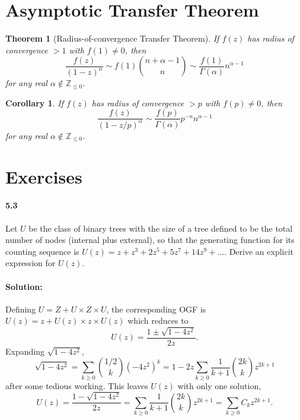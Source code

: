 \documentclass{article}
\newtheorem{corollary}{Corollary}
\newtheorem{theorem}{Theorem}
\begin{document}
\section{Asymptotic Transfer Theorem}

\begin{theorem}[Radius-of-convergence Transfer Theorem]
  If $f(z)$ has radius of convergence $> 1$ with $f(1) \neq 0$, then
  \begin{equation*}
    [z^n]\frac{f(z)}{(1 - z)^{\alpha}}
      \sim f(1)\binom{n + \alpha - 1}{n}
      \sim \frac{f(1)}{\Gamma(\alpha)}n^{\alpha - 1}
  \end{equation*} for any real $\alpha \notin \mathbb{Z}_{\leq 0}$.
\end{theorem}

\begin{corollary}
  If $f(z)$ has radius of convergence $> p$ with $f(p) \neq 0$, then
  \begin{equation*}
    [z^n]\frac{f(z)}{(1 - z/p)^{\alpha}}
      \sim \frac{f(p)}{\Gamma(\alpha)}p^{-n}n^{\alpha - 1}
  \end{equation*} for any real $\alpha \notin \mathbb{Z}_{\leq 0}$.
\end{corollary}

\section{Exercises}

\paragraph{5.3} Let $U$ be the class of binary trees with the size of a tree
defined to be the total number of nodes (internal plus external), so that the
generating function for its counting sequence is $U(z) = z + z^3 + 2z^5 + 5z^7
+ 14z^9 + \ldots$. Derive an explicit expression for $U(z)$.

\paragraph{Solution:} Defining $U = Z + U \times Z \times U$, the corresponding
OGF is $U(z) = z + U(z) \times z \times U(z)$ which reduces to
\begin{equation*}
  U(z) = \frac{1 \pm \sqrt{1 - 4z^2}}{2z}.
\end{equation*} Expanding $\sqrt{1 - 4z^2}$, \begin{equation*}
\sqrt{1 - 4z^2} = \sum_{k \geq 0} \binom{1/2}{k}(-4z^2)^k
  = 1 - 2z\sum_{k \geq 0} \frac{1}{k + 1}\binom{2k}{k}z^{2k + 1}
\end{equation*} after some tedious working. This leaves $U(z)$ with only one
solution, \begin{equation*}
  U(z) = \frac{1 - \sqrt{1 - 4z^2}}{2z}
  = \sum_{k \geq 0} \frac{1}{k + 1}\binom{2k}{k}z^{2k + 1}
  = \sum_{k \geq 0} C_kz^{2k + 1}.
\end{equation*}
\end{document}

